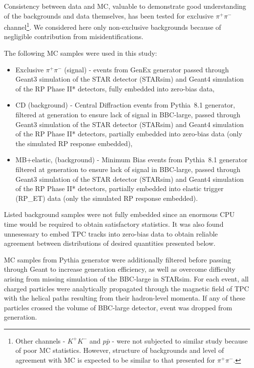 Consistency between data and MC, valuable to demonstrate good understanding of the backgrounds and data themselves, has been tested for exclusive $\pi^{+}\pi^{-}$ channel\footnote{Other channels - $K^{+}K^{-}$ and $p\bar{p}$ - were not subjected to similar study because of poor MC statistics. However, structure of backgrounds and level of agreement with MC is expected to be similar to that presented for $\pi^{+}\pi^{-}$.}. We considered here only non-exclusive backgrounds because of negligible contribution from misidentifications.

The following MC samples were used in this study:
\begin{itemize}
 \item Exclusive $\pi^{+}\pi^{-}$ (signal) - events from GenEx\cite{GenEx} generator passed through Geant3 simulation of the STAR detector (STARsim) and Geant4 simulation of the RP Phase II* detectors, fully embedded into zero-bias data,
 \item CD (background) - Central Diffraction events from Pythia~8.1 generator, filtered at generation to ensure lack of signal in BBC-large, passed through Geant3 simulation of the STAR detector (STARsim) and Geant4 simulation of the RP Phase II* detectors, partially embedded into zero-bias data (only the simulated RP response embedded),
 \item MB+elastic, (background) - Minimum Bias events from Pythia~8.1 generator filtered at generation to ensure lack of signal in BBC-large, passed through Geant3 simulation of the STAR detector (STARsim) and Geant4 simulation of the RP Phase II* detectors, partially embedded into elastic trigger (RP\_ET) data (only the simulated RP response embedded).
\end{itemize}

Listed background samples were not fully embedded since an enormous CPU time would be required to obtain satisfactory statistics. It was also found unnesessary to embed TPC tracks into zero-bias data to obtain reliable agreement between distributions of desired quantities presented below.

MC samples from Pythia generator were additionally filtered before passing through Geant to increase generation efficiency, as well as overcome difficulty arising from missing simulation of the BBC-large in STARsim. For each event, all charged particles were analytically propagated through the magnetic field of TPC with the helical paths resulting from their hadron-level momenta. If any of these particles crossed the volume of BBC-large detector, event was dropped from generation.

